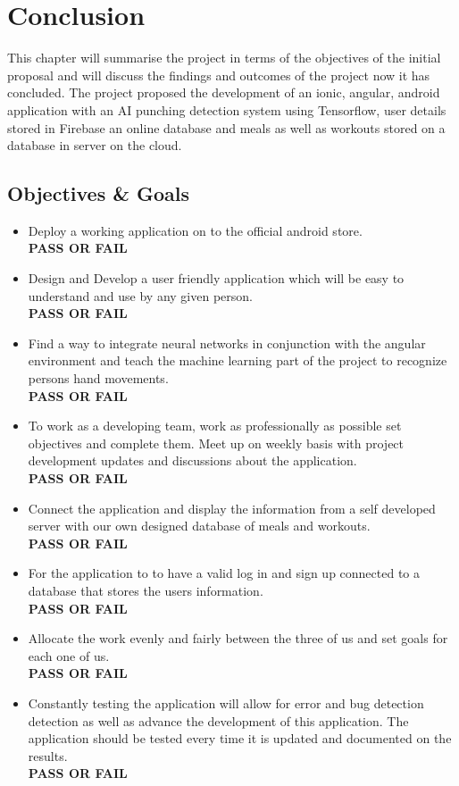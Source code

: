 \documentclass[a4paper,12pt]{report}
\begin{document}
\chapter{Conclusion}
This chapter will summarise the project in terms of the objectives of
the initial proposal and will discuss the findings and outcomes of the
project now it has concluded.
The project proposed the development of an ionic, angular, android application
with an AI punching detection system using Tensorflow, user details stored in Firebase an online
database and meals as well as workouts stored on a database in server on the cloud.

\section{Objectives \& Goals}
\begin{itemize}

\item Deploy a working application on to the official android store.\\
\textbf{PASS OR FAIL}
\item Design and Develop a user friendly application which will be easy to understand and use by any given person.\\
\textbf{PASS OR FAIL}
\item Find a way to integrate neural networks in conjunction with the angular environment and teach the machine learning part of the project to recognize persons hand movements.\\
\textbf{PASS OR FAIL}
\item To work as a developing team, work as professionally as possible set objectives and complete them. Meet up on weekly basis with project development updates and discussions about the application.\\
\textbf{PASS OR FAIL} 
\item Connect the application and display the information from a self developed server with our own designed database of meals and workouts.\\
\textbf{PASS OR FAIL}
\item For the application to to have a valid log in and sign up connected to a database that stores the users information.\\
\textbf{PASS OR FAIL}
\item Allocate the work evenly and fairly between the three of us and set goals for each one of us.\\
\textbf{PASS OR FAIL}
\item Constantly testing the application will allow for error and bug detection detection as well as advance the development of this application. The application should be tested every time it is updated and documented on the results.\\
\textbf{PASS OR FAIL}  
\end{itemize}
\end{document}
